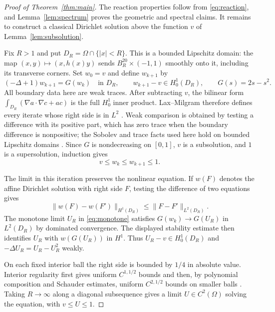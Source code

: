 \documentclass[11pt,a4paper]{article}
\newcommand{\Om}{\Omega}
\begin{document}
\begin{proof}[Proof of Theorem~\ref{thm:main}]
The reaction properties follow from \eqref{eq:reaction}, and
Lemma~\ref{lem:spectrum} proves the geometric and spectral claims.
It remains to construct a classical Dirichlet solution above the function
$v$ of Lemma~\ref{lem:subsolution}.

Fix $R>1$ and put $D_R=\Om\cap\{|x|<R\}$. This is a bounded Lipschitz
domain: the map $(x,y)\mapsto(x,h(x)y)$ sends
$B_R^{20}\times(-1,1)$ smoothly onto it, including its transverse corners.
Set $w_0=v$ and define $w_{k+1}$ by
\begin{equation}\label{eq:iteration}
 (-\Delta+1)w_{k+1}=G(w_k)\quad\text{in }D_R,\qquad
 w_{k+1}-v\in H^1_0(D_R),\qquad G(s)=2s-s^2.
\end{equation}
All boundary data here are weak traces. After subtracting $v$, the bilinear
form $\int_{D_R}(\nabla a\cdot\nabla c+ac)$ is the full $H^1_0$ inner
product. Lax--Milgram therefore defines every iterate whose right side is
in $L^2$ \cite[Theorem~4.20]{HunterPDE}. Weak comparison is obtained by
testing a difference with its positive part, which has zero trace when
the boundary difference is nonpositive; the Sobolev and trace facts used
here hold on bounded Lipschitz domains \cite[Section~1.1]{FRRO}.
Since $G$ is nondecreasing on $[0,1]$, $v$ is a subsolution, and $1$ is a
supersolution, induction gives
\begin{equation}\label{eq:monotone}
 v\le w_k\le w_{k+1}\le1.
\end{equation}

The limit in this iteration preserves the nonlinear equation. If $w(F)$
denotes the affine Dirichlet solution with right side $F$, testing the
difference of two equations gives
\[
 \|w(F)-w(F')\|_{H^1(D_R)}\le\|F-F'\|_{L^2(D_R)}.
\]
The monotone limit $U_R$ in \eqref{eq:monotone} satisfies
$G(w_k)\to G(U_R)$ in $L^2(D_R)$ by dominated convergence. The displayed
stability estimate then identifies $U_R$ with $w(G(U_R))$ in $H^1$.
Thus $U_R-v\in H^1_0(D_R)$ and
$-\Delta U_R=U_R-U_R^2$ weakly.

On each fixed interior ball the right side is bounded by $1/4$ in absolute
value. Interior regularity first gives uniform $C^{1,1/2}$ bounds and then,
by polynomial composition and Schauder estimates, uniform $C^{2,1/2}$
bounds on smaller balls \cite[Proposition~2.18 and Corollary~2.16]{FRRO}.
Taking $R\to\infty$ along a diagonal subsequence gives a limit
$U\in C^2(\Om)$ solving the equation, with $v\le U\le1$.


\end{proof}
\end{document}
